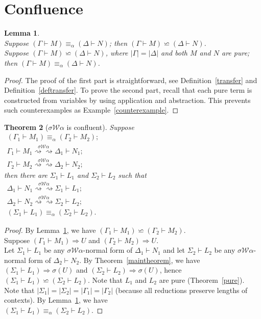 \documentclass[11pt]{amsart}
\theoremstyle{plain}
\newtheorem{theorem}{Theorem}[section]
\newtheorem{lemma}[theorem]{Lemma}
\theoremstyle{definition}
\theoremstyle{remark}
\numberwithin{equation}{section}
\newcommand{\ri}{\rightsquigarrow}
\newcommand{\alp}{\equiv_{\alpha}}
\renewcommand{\pi}{\mathcal{W}}
\begin{document}
\section{Confluence}
\begin{lemma}\label{alpequiv}$ $\\
Suppose $(\Gamma\vdash M)\alp(\Delta\vdash N)$;
 then $(\Gamma\vdash M)\backsimeq(\Delta\vdash
N)$.\\
 Suppose $(\Gamma\vdash M)\backsimeq(\Delta\vdash N)$, where
$|\Gamma|=|\Delta|$ and both $M$ and $N$ are pure;
 then $(\Gamma\vdash
M)\alp(\Delta\vdash N)$.
\end{lemma}
\begin{proof}The proof of the first part is straightforward, see Definition~\ref{transfer} and Definition~\ref{deftransfer}.  To prove the second part, recall that each pure term is constructed from variables by using
 application and abstraction. This prevents  such
 counterexamples as Example~\ref{counterexample}.
\end{proof}
\begin{theorem}[$\sigma\pi\alpha$ is confluent]\label{confluence1}
Suppose\\
$\begin{array}{l}
 (\Gamma_1\vdash M_1)\alp(\Gamma_2\vdash M_2);\\
 \Gamma_1\vdash M_1\overset{\sigma\pi\alpha}{\ri\ri}\Delta_1\vdash N_1;\\
 \Gamma_2\vdash
M_2\overset{\sigma\pi\alpha}{\ri\ri}\Delta_2\vdash N_2;
\end{array}$\\
then there are $\Sigma_1\vdash L_1$ and $\Sigma_2\vdash L_2$ such
that\\
$\begin{array}{l} \Delta_1\vdash
N_1\overset{\sigma\pi\alpha}{\ri\ri}\Sigma_1\vdash
L_1;\\
 \Delta_2\vdash N_2\overset{\sigma\pi\alpha}{\ri\ri}\Sigma_2\vdash L_2;\\
 (\Sigma_1\vdash L_1)\alp(\Sigma_2\vdash L_2).
\end{array}$
\end{theorem}
\begin{proof}By Lemma~\ref{alpequiv}, we have $(\Gamma_1\vdash M_1)\backsimeq(\Gamma_2\vdash M_2)$.\\ Suppose
$(\Gamma_1\vdash M_1)\boldsymbol{\Rightarrow}U$ and
$(\Gamma_2\vdash M_2)\boldsymbol{\Rightarrow}U$.\\
 Let $\Sigma_1\vdash L_1$ be any $\sigma\pi\alpha$-normal form of $\Delta_1\vdash N_1$ and let $\Sigma_2\vdash L_2$ be
any $\sigma\pi\alpha$-normal form of $\Delta_2\vdash N_2$. By
Theorem~\ref{maintheorem}, we have\\ $(\Sigma_1\vdash
L_1)\boldsymbol{\Rightarrow}\sigma(U)$ and  $(\Sigma_2\vdash
L_2)\boldsymbol{\Rightarrow}\sigma(U)$, hence\\ $(\Sigma_1\vdash
L_1)\backsimeq(\Sigma_2\vdash L_2)$. Note that $L_1$ and $L_2$ are
pure (Theorem~\ref{pure}). Note that
$|\Sigma_1|=|\Sigma_2|=|\Gamma_1|=|\Gamma_2|$ (because all
reductions preserve lengths of contexts). By Lemma~\ref{alpequiv},
we have\\
 $(\Sigma_1\vdash L_1)\alp(\Sigma_2\vdash L_2)$.
\end{proof}
\end{document}
